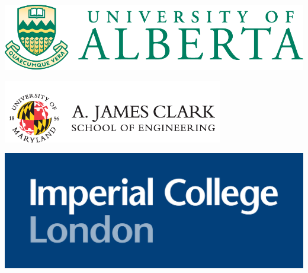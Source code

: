 \documentclass{article}
\begin{document}
\centering
\includegraphics[width=0.5\linewidth]{./u-of-alberta-logo.pdf}
\vspace{5em}
\begin{minipage}{\linewidth}
      \centering
      \begin{minipage}{0.45\linewidth}

              \includegraphics[width=\linewidth]{clark.png}

      \end{minipage}
      \hspace{0.01\linewidth}
      \begin{minipage}{0.45\linewidth}

              \includegraphics[width=\linewidth]{icl.png}

      \end{minipage}
  \end{minipage}
\end{document}
